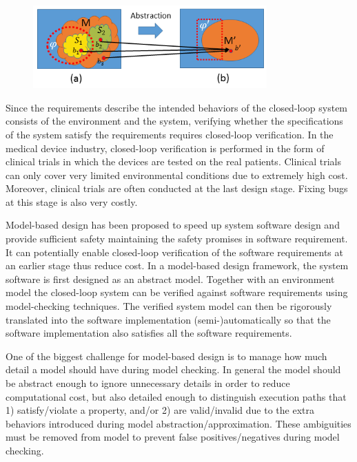 \documentclass{llncs}
\begin{document}
\begin{figure}[!t]
		\centering
		\includegraphics[width=0.8\textwidth]{figs/distinction.png}
		\caption{\small }
		\label{fig:distinction}
\end{figure}

Since the requirements describe the intended behaviors of the closed-loop system consists of the environment and the system, verifying whether the specifications of the system satisfy the requirements requires closed-loop verification. In the medical device industry,    closed-loop verification is performed in the form of clinical trials in which the devices are tested on the real patients. Clinical trials can only cover very limited environmental conditions due to extremely high cost. Moreover, clinical trials are often conducted at the last design stage. Fixing bugs at this stage is also very costly.

Model-based design has been proposed to speed up system software design and provide sufficient safety maintaining the safety promises in software requirement. It can potentially enable closed-loop verification of the software requirements at an earlier stage thus reduce cost. In a model-based design framework, the system software is first designed as an abstract model. Together with an environment model the closed-loop system can be verified against software requirements using model-checking techniques. The verified system model can then be rigorously translated into the software implementation (semi-)automatically so that the software implementation also satisfies all the software requirements.


One of the biggest challenge for model-based design is to manage how much detail a model should have during model checking. In general the model should be abstract enough to ignore unnecessary details in order to reduce computational cost, but also detailed enough to distinguish execution paths that 1) satisfy/violate a property, and/or 2) are valid/invalid due to the extra behaviors introduced during model abstraction/approximation. These ambiguities must be removed from model to prevent false positives/negatives during model checking. 
\end{document}
